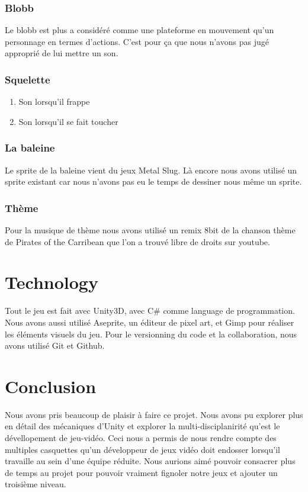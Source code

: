 \documentclass{prologArticle}
\begin{document}
\subsubsection{Blobb}
Le blobb est plus a considéré comme une plateforme en mouvement qu'un personnage en termes d'actions. C'est pour ça que nous n'avons pas jugé approprié de lui mettre un son.

\subsubsection{Squelette}
\begin{enumerate}
    \item Son lorsqu'il frappe
    \item Son lorsqu'il se fait toucher
\end{enumerate}

\subsubsection{La baleine}

Le sprite de la baleine vient du jeux Metal Slug. Là encore nous avons utilisé un sprite existant car nous n'avons pas eu le temps de dessiner nous même un sprite.


\subsubsection{Thème}
Pour la musique de thème nous avons utilisé un remix 8bit de la chanson thème de Pirates of the Carribean que l'on a trouvé libre de droits sur youtube.


\section{Technology}
Tout le jeu est fait avec Unity3D, avec C\# comme language de programmation. Nous avons aussi utilisé Aseprite, un éditeur de pixel art, et Gimp pour réaliser les éléments visuels du jeu. Pour le versionning du code et la collaboration, nous avons utilisé Git et Github.


\section{Conclusion}
Nous avons pris beaucoup de plaisir à faire ce projet. Nous avons pu explorer plus en détail des mécaniques d'Unity et explorer la multi-disciplanirité qu'est le dévellopement de jeu-vidéo. Ceci nous a permis de nous rendre compte des multiples casquettes qu'un développeur de jeux vidéo doit endosser lorsqu'il travaille au sein d'une équipe réduite. Nous aurions aimé pouvoir consacrer plus de temps au projet pour pouvoir vraiment fignoler notre jeux et ajouter un troisième niveau.
\end{document}
